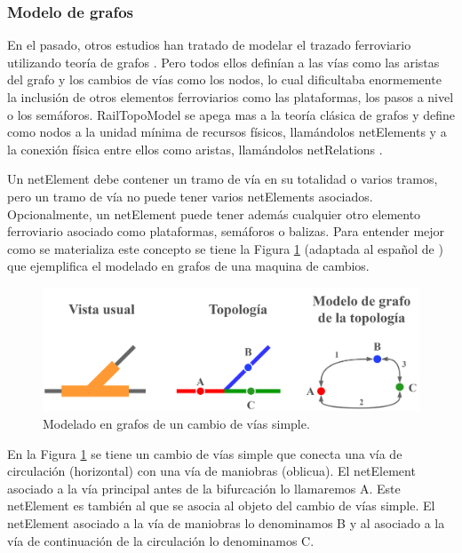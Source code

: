 \subsubsection{Modelo de grafos}
    \label{sec:RTM}
    
    En el pasado, otros estudios han tratado de modelar el trazado ferroviario utilizando teoría de grafos \cite{Paper_9,Paper_101,Paper_102,Paper_103}. Pero todos ellos definían a las vías como las aristas del grafo y los cambios de vías como los nodos, lo cual dificultaba enormemente la inclusión de otros elementos ferroviarios como las plataformas, los pasos a nivel o los semáforos. RailTopoModel se apega mas a la teoría clásica de grafos y define como nodos a la unidad mínima de recursos físicos, llamándolos netElements y a la conexión física entre ellos como aristas, llamándolos netRelations \cite{Paper_109}.

    Un netElement debe contener un tramo de vía en su totalidad o varios tramos, pero un tramo de vía no puede tener varios netElements asociados. Opcionalmente, un netElement puede tener además cualquier otro elemento ferroviario asociado como plataformas, semáforos o balizas. Para entender mejor como se materializa este concepto se tiene la Figura \ref{fig:grafos_1} (adaptada al español de \cite{Paper_109}) que ejemplifica el modelado en grafos de una maquina de cambios.

    \begin{figure}[H]
        \centering
        \includegraphics[width=1\textwidth]{Figuras/grafos}
        \centering\caption{Modelado en grafos de un cambio de vías simple.}
        \label{fig:grafos_1}
    \end{figure}

    En la Figura \ref{fig:grafos_1} se tiene un cambio de vías simple que conecta una vía de circulación (horizontal) con una vía de maniobras (oblicua). El netElement asociado a la vía principal antes de la bifurcación lo llamaremos A. Este netElement es también al que se asocia al objeto del cambio de vías simple. El netElement asociado a la vía de maniobras lo denominamos B y al asociado a la vía de continuación de la circulación lo denominamos C.


